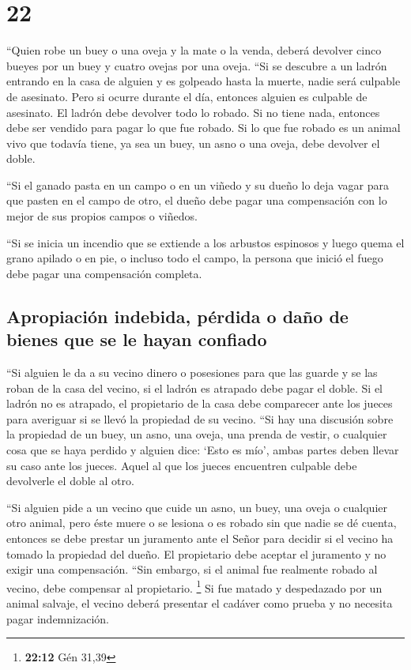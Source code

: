 \hypertarget{section-21}{%
\section{22}\label{section-21}}

 ``Quien robe un buey o una oveja y la mate o la venda,
deberá devolver cinco bueyes por un buey y cuatro ovejas por una oveja.
 ``Si se descubre a un ladrón entrando en la casa de
alguien y es golpeado hasta la muerte, nadie será culpable de asesinato.
 Pero si ocurre durante el día, entonces alguien es
culpable de asesinato. El ladrón debe devolver todo lo robado. Si no
tiene nada, entonces debe ser vendido para pagar lo que fue robado.
 Si lo que fue robado es un animal vivo que todavía tiene,
ya sea un buey, un asno o una oveja, debe devolver el doble.

 ``Si el ganado pasta en un campo o en un viñedo y su
dueño lo deja vagar para que pasten en el campo de otro, el dueño debe
pagar una compensación con lo mejor de sus propios campos o viñedos.

 ``Si se inicia un incendio que se extiende a los arbustos
espinosos y luego quema el grano apilado o en pie, o incluso todo el
campo, la persona que inició el fuego debe pagar una compensación
completa.

\hypertarget{apropiaciuxf3n-indebida-puxe9rdida-o-dauxf1o-de-bienes-que-se-le-hayan-confiado}{%
\subsection{Apropiación indebida, pérdida o daño de bienes que se le
hayan
confiado}\label{apropiaciuxf3n-indebida-puxe9rdida-o-dauxf1o-de-bienes-que-se-le-hayan-confiado}}

 ``Si alguien le da a su vecino dinero o posesiones para
que las guarde y se las roban de la casa del vecino, si el ladrón es
atrapado debe pagar el doble.  Si el ladrón no es
atrapado, el propietario de la casa debe comparecer ante los jueces para
averiguar si se llevó la propiedad de su vecino.  ``Si hay
una discusión sobre la propiedad de un buey, un asno, una oveja, una
prenda de vestir, o cualquier cosa que se haya perdido y alguien dice:
`Esto es mío', ambas partes deben llevar su caso ante los jueces. Aquel
al que los jueces encuentren culpable debe devolverle el doble al otro.

 ``Si alguien pide a un vecino que cuide un asno, un
buey, una oveja o cualquier otro animal, pero éste muere o se lesiona o
es robado sin que nadie se dé cuenta,  entonces se debe
prestar un juramento ante el Señor para decidir si el vecino ha tomado
la propiedad del dueño. El propietario debe aceptar el juramento y no
exigir una compensación.  ``Sin embargo, si el animal fue
realmente robado al vecino, debe compensar al propietario. \footnote{\textbf{22:12}
  Gén 31,39}  Si fue matado y despedazado por un animal
salvaje, el vecino deberá presentar el cadáver como prueba y no necesita
pagar indemnización.

